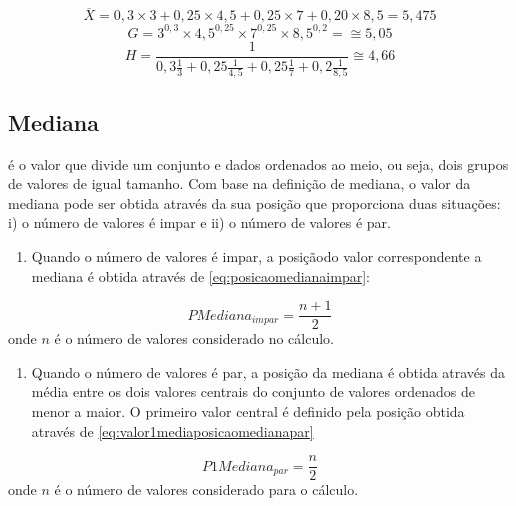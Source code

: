 \documentclass[
]{book}
\providecommand{\tightlist}{%
  \setlength{\itemsep}{0pt}\setlength{\parskip}{0pt}}
\begin{document}
\begin{equation*}
    \overline{X} = 0,3\times 3 + 0,25\times 4,5 + 0,25\times 7 + 0,20 \times 8,5 = 5,475
  \end{equation*}
\begin{equation*}
    G = 3^{0,3} \times 4,5^{0,25} \times 7^{0,25} \times 8,5^{0,2} = \cong 5,05
  \end{equation*}
\begin{equation*}
    H = \frac{1}{0,3\frac{1}{3} +0,25\frac{1}{4,5} +0,25\frac{1}{7} +0,2\frac{1}{8,5}}   \cong 4,66
  \end{equation*}

\hypertarget{mediana}{%
\subsection{Mediana}\label{mediana}}

é o valor que divide um conjunto e dados ordenados ao meio, ou seja, dois
grupos de valores de igual tamanho. Com base na definição de mediana, o valor da mediana pode ser obtida através da sua posição que proporciona duas situações: i) o número de valores é impar e ii) o número de valores é par.

\begin{enumerate}
\def\labelenumi{\roman{enumi})}
\tightlist
\item
  Quando o número de valores é impar, a posiçãodo valor correspondente a mediana é obtida através de \eqref{eq:posicaomedianaimpar}:
\end{enumerate}

\begin{equation}
  PMediana_{impar} = \dfrac{n + 1}{2}
  \label{eq:posicaomedianaimpar}
\end{equation}
onde \(n\) é o número de valores considerado no cálculo.

\begin{enumerate}
\def\labelenumi{\roman{enumi})}
\setcounter{enumi}{1}
\tightlist
\item
  Quando o número de valores é par, a posição da mediana é obtida através da média entre os dois valores centrais do conjunto de valores ordenados de menor a maior. O primeiro valor central é definido pela posição obtida através de \eqref{eq:valor1mediaposicaomedianapar}
\end{enumerate}

\begin{equation}
  P1Mediana_{par} = \dfrac{n}{2}
  \label{eq:valor1mediaposicaomedianapar}
\end{equation}
onde \(n\) é o número de valores considerado para o cálculo.
\end{document}
